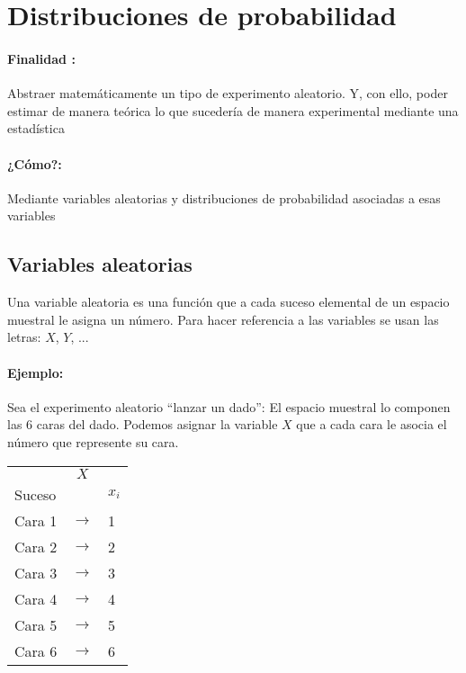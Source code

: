 \hypertarget{distribuciones-de-probabilidad}{%
\section{Distribuciones de
probabilidad}\label{distribuciones-de-probabilidad}}

\hypertarget{finalidad}{%
\paragraph{Finalidad :}\label{finalidad}}

Abstraer matemáticamente un tipo de experimento aleatorio. Y, con ello,
poder estimar de manera teórica lo que sucedería de manera experimental
mediante una estadística

\hypertarget{cuxf3mo}{%
\paragraph{¿Cómo?:}\label{cuxf3mo}}

Mediante variables aleatorias y distribuciones de probabilidad asociadas
a esas variables

\hypertarget{variables-aleatorias}{%
\subsection{Variables aleatorias}\label{variables-aleatorias}}

Una variable aleatoria es una función que a cada suceso elemental de un
espacio muestral le asigna un número. Para hacer referencia a las
variables se usan las letras: \(X\), \(Y\), ...

\hypertarget{ejemplo}{%
\paragraph{Ejemplo:}\label{ejemplo}}

Sea el experimento aleatorio ``lanzar un dado'': El espacio muestral lo
componen las 6 caras del dado. Podemos asignar la variable \(X\) que a
cada cara le asocia el número que represente su cara.

\begin{longtable}[]{@{}lcl@{}}
\toprule
\endhead
& \(X\) &\tabularnewline
Suceso & & \(x_i\)\tabularnewline
Cara 1 & \(\rightarrow\) & 1\tabularnewline
Cara 2 & \(\rightarrow\) & 2\tabularnewline
Cara 3 & \(\rightarrow\) & 3\tabularnewline
Cara 4 & \(\rightarrow\) & 4\tabularnewline
Cara 5 & \(\rightarrow\) & 5\tabularnewline
Cara 6 & \(\rightarrow\) & 6\tabularnewline
\bottomrule
\end{longtable}

